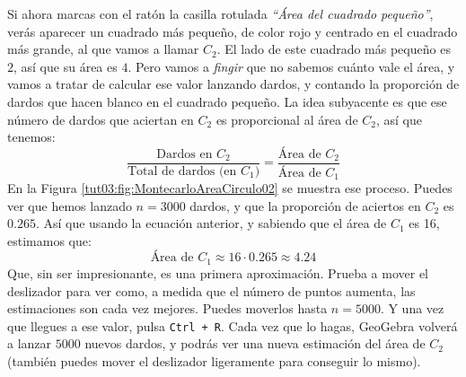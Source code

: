\documentclass[10pt,a4paper]{article}\usepackage[]{graphicx}\usepackage[]{color}
\newcounter {cont01}
\begin{document}
Si ahora marcas con el ratón la casilla rotulada {\em ``Área del cuadrado pequeño''}, verás aparecer un cuadrado más pequeño, de color rojo y centrado en el cuadrado más grande, al que vamos a llamar $C_2$. El lado de este cuadrado más pequeño es $2$, así que su área es $4$. Pero vamos a {\em fingir} que no sabemos cuánto vale el área, y vamos a tratar de calcular ese valor lanzando dardos, y contando la proporción de dardos que hacen blanco en el cuadrado pequeño. La idea subyacente es que ese número de dardos que aciertan en $C_2$ es proporcional al área de $C_2$, así que tenemos:
     \[
          \dfrac{\mbox{Dardos en $C_2$}}{\mbox{Total de dardos (en $C_1$)}} =
               \dfrac{\mbox{Área de $C_2$}}{\mbox{Área de $C_1$}}
          \]
En la Figura \ref{tut03:fig:MontecarloAreaCirculo02} se muestra ese proceso. Puedes ver que hemos lanzado $n=3000$ dardos, y que la proporción de aciertos en $C_2$ es $0.265$. Así que usando la ecuación anterior, y sabiendo que el área de $C_1$ es 16, estimamos que:
     \[
          \mbox{Área de $C_1$} \approx 16\cdot 0.265\approx 4.24
          \]
Que, sin ser impresionante, es una primera aproximación. Prueba a mover el deslizador para ver como,  a medida que el número de puntos aumenta, las estimaciones son cada vez mejores. Puedes moverlos hasta $n=5000$. Y una vez que llegues a ese valor, pulsa {\tt Ctrl + R}. Cada vez que lo hagas, GeoGebra volverá a lanzar $5000$ nuevos dardos, y podrás ver una nueva estimación del área de $C_2$ (también puedes mover el deslizador ligeramente para conseguir lo mismo).
\end{document}
